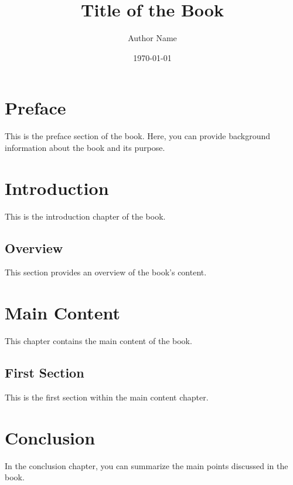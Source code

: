 \documentclass{book}
\title{Title of the Book}
\author{Author Name}
\date{\today}
\begin{document}
\frontmatter

\maketitle

\chapter{Preface}
This is the preface section of the book. Here, you can provide background information about the book and its purpose.

\tableofcontents

\mainmatter

\chapter{Introduction}
This is the introduction chapter of the book.

\section{Overview}
This section provides an overview of the book's content.

\chapter{Main Content}
This chapter contains the main content of the book.

\section{First Section}
This is the first section within the main content chapter.

\backmatter

\chapter{Conclusion}
In the conclusion chapter, you can summarize the main points discussed in the book.
\end{document}
